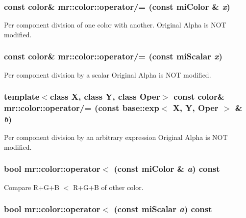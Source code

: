 \subsubsection{\setlength{\rightskip}{0pt plus 5cm}const {\bf color}\& mr::color::operator/= (const mi\-Color \& {\em x})\hspace{0.3cm}{\tt  [inline]}}\label{structmr_1_1color_z14_12}


Per component division of one color with another. Original Alpha is NOT modified. 
\subsubsection{\setlength{\rightskip}{0pt plus 5cm}const {\bf color}\& mr::color::operator/= (const mi\-Scalar {\em x})\hspace{0.3cm}{\tt  [inline]}}\label{structmr_1_1color_z14_11}


Per component division by a scalar Original Alpha is NOT modified. 
\subsubsection{\setlength{\rightskip}{0pt plus 5cm}template$<$class X, class Y, class Oper$>$ const {\bf color}\& mr::color::operator/= (const {\bf base::exp}$<$ X, Y, Oper $>$ \& {\em b})\hspace{0.3cm}{\tt  [inline]}}\label{structmr_1_1color_z14_10}


Per component division by an arbitrary expression Original Alpha is NOT modified. 
\subsubsection{\setlength{\rightskip}{0pt plus 5cm}bool mr::color::operator$<$ (const mi\-Color \& {\em a}) const\hspace{0.3cm}{\tt  [inline]}}\label{structmr_1_1color_z11_4}


Compare R+G+B $<$ R+G+B of other color. 

\subsubsection{\setlength{\rightskip}{0pt plus 5cm}bool mr::color::operator$<$ (const mi\-Scalar {\em a}) const\hspace{0.3cm}{\tt  [inline]}}\label{structmr_1_1color_z11_0}


